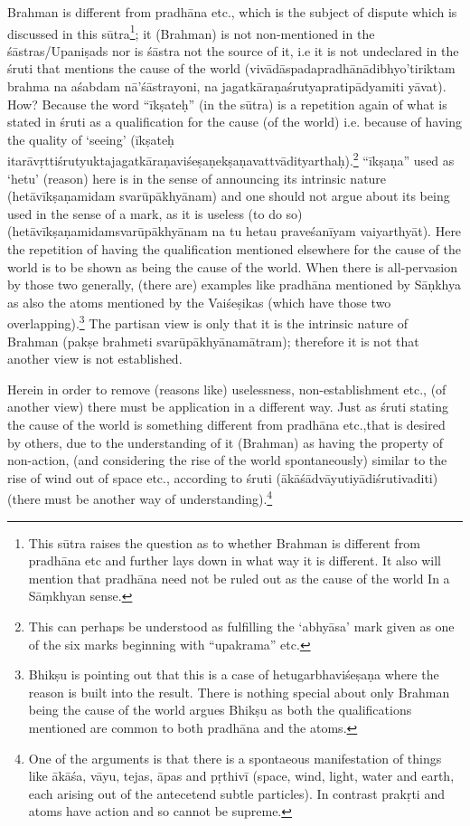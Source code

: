 Brahman is different from pradhāna etc.,  which is the subject of dispute which is discussed in this sūtra\footnote{This sūtra raises the question as to whether Brahman is different from pradhāna etc and further lays down in what way it is different. It also will mention that pradhāna need not be ruled out as the cause of the world In a Sāṃkhyan sense.}; it (Brahman) is not non-men\-tioned in the śāstras/Upaniṣads nor is śāstra not the source of it, i.e it is not undeclared in the śruti that mentions the cause of the world (vivādāspadapradhānādibhyo’tiriktam brahma na aśabdam nā’śāstra\-yoni, na jagatkāraṇaśrutyapratipādyamiti yāvat). How? Because the word “īkṣateḥ” (in the sūtra) is a repetition again of what is stated in śruti as a qualification for the cause (of the world) i.e. because of having the quality of ‘seeing’ (īkṣateḥ itarāvṛttiśrutyuktajagatkāraṇaviśe\-ṣaṇekṣaṇavattvādityarthaḥ).\footnote{This can perhaps be understood as fulfilling the ‘abhyāsa’ mark given as one of the six marks beginning with “upakrama” etc.} “īkṣaṇa” used as  ‘hetu’ (reason) here is in the sense of announcing its intrinsic nature (hetāvīkṣaṇamidam svarūpākhyānam) and one should not argue about its being used in the sense of a mark, as it is useless (to do so) (hetāvīkṣaṇamidamsvarūpā\-khyānam na tu hetau praveśanīyam vaiyarthyāt). Here the repetition of having the qualification mentioned elsewhere for the cause of the world is to be shown as being the cause of the world. When there is all-pervasion by those two  generally, (there are) examples like pradhāna mentioned by Sāṇkhya as also the atoms mentioned by the Vaiśeṣikas (which have those two overlapping).\footnote{Bhikṣu is pointing out that this is a case of hetugarbhaviśeṣaṇa where the reason is built into the result. There is nothing special about only Brahman being the cause of the world argues Bhikṣu as both the qualifications mentioned are common to both pradhāna and the atoms.} The partisan view is only that it is the intrinsic nature of Brahman (pakṣe brahmeti svarūpākhyānamātram); therefore it is not that another view is not established.

Herein in order to remove (reasons like) uselessness, non-establish\-ment etc., (of another view) there must be application in a different way. Just as śruti stating the cause of the world is something different from pradhāna etc.,that is desired by others, due to the understanding of it (Brahman) as having the property of non-action, (and considering the rise of the world spontaneously) similar to the rise of wind out of space etc., according to śruti (ākāśādvāyutiyādiśrutivaditi) (there must be another way of understanding).\footnote{One of the arguments is that there is a spontaeous manifestation of things like ākāśa, vāyu, tejas, āpas and pṛthivī (space, wind, light, water and earth, each arising out of the antecetend subtle particles). In contrast prakṛti and atoms have action and so cannot be supreme.} 

